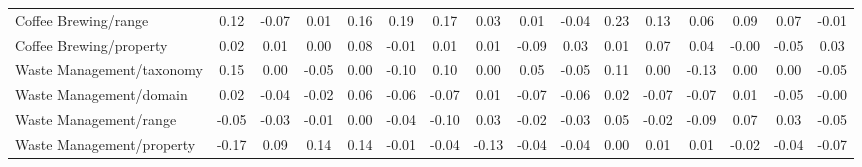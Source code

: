 \begin{tabular}{lccccccccccccccc}
Coffee Brewing/range & 0.12 & -0.07 & 0.01 & 0.16 & 0.19 & 0.17 & 0.03 & 0.01 & -0.04 & 0.23 & 0.13 & 0.06 & 0.09 & 0.07 & -0.01 \\
Coffee Brewing/property & 0.02 & 0.01 & 0.00 & 0.08 & -0.01 & 0.01 & 0.01 & -0.09 & 0.03 & 0.01 & 0.07 & 0.04 & -0.00 & -0.05 & 0.03 \\
Waste Management/taxonomy & 0.15 & 0.00 & -0.05 & 0.00 & -0.10 & 0.10 & 0.00 & 0.05 & -0.05 & 0.11 & 0.00 & -0.13 & 0.00 & 0.00 & -0.05 \\
Waste Management/domain & 0.02 & -0.04 & -0.02 & 0.06 & -0.06 & -0.07 & 0.01 & -0.07 & -0.06 & 0.02 & -0.07 & -0.07 & 0.01 & -0.05 & -0.00 \\
Waste Management/range & -0.05 & -0.03 & -0.01 & 0.00 & -0.04 & -0.10 & 0.03 & -0.02 & -0.03 & 0.05 & -0.02 & -0.09 & 0.07 & 0.03 & -0.05 \\
Waste Management/property & -0.17 & 0.09 & 0.14 & 0.14 & -0.01 & -0.04 & -0.13 & -0.04 & -0.04 & 0.00 & 0.01 & 0.01 & -0.02 & -0.04 & -0.07 \\
\bottomrule
\end{tabular}
